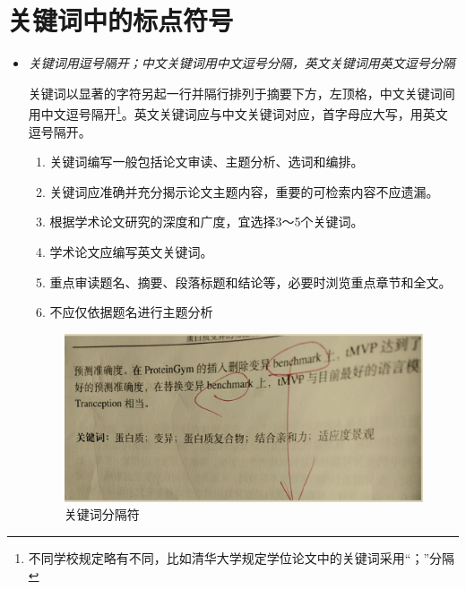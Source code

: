 \section{关键词中的标点符号}
\begin{itemize}
\item \emph{关键词用逗号隔开；中文关键词用中文逗号分隔，英文关键词用英文逗号分隔}

关键词以显著的字符另起一行并隔行排列于摘要下方，左顶格，中文关键词间用中文逗号隔开\footnote{不同学校规定略有不同，比如清华大学规定学位论文中的关键词采用“；”分隔}。英文关键词应与中文关键词对应，首字母应大写，用英文逗号隔开。
\begin{enumerate}
\item 关键词编写一般包括论文审读、主题分析、选词和编排。
\item 关键词应准确并充分揭示论文主题内容，重要的可检索内容不应遗漏。
\item 根据学术论文研究的深度和广度，宜选择3～5个关键词。
\item 学术论文应编写英文关键词。
\item 重点审读题名、摘要、段落标题和结论等，必要时浏览重点章节和全文。
\item 不应仅依据题名进行主题分析
\end{enumerate}
\begin{figure}[!htpb]
\centering
\includegraphics[scale=0.65]{doc/figures/chk05.jpg}
\caption{关键词分隔符}
\label{fig:keywords-sep}
\end{figure}
\end{itemize}





